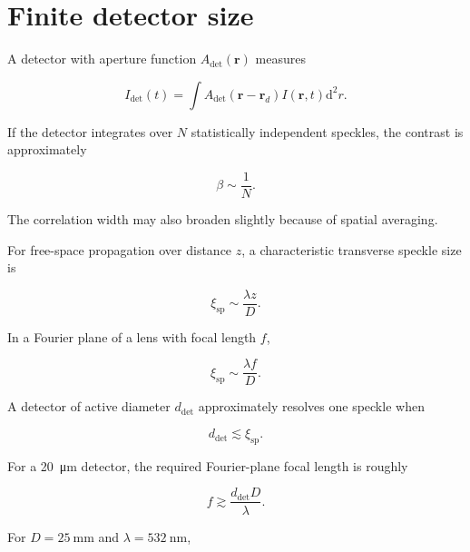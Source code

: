 \documentclass[11pt]{article}
\renewcommand{\dd}{\mathrm{d}}
\newcommand{\rvec}{\mathbf{r}}
\begin{document}
\section{Finite detector size}

A detector with aperture function $A_{\mathrm{det}}(\rvec)$ measures

\begin{equation}
    I_{\mathrm{det}}(t)
    =
    \int
    A_{\mathrm{det}}(\rvec-\rvec_d)
    I(\rvec,t)
    \dd^2r.
\end{equation}

If the detector integrates over $N$ statistically independent speckles, the
contrast is approximately

\begin{equation}
    \beta\sim\frac{1}{N}.
\end{equation}

The correlation width may also broaden slightly because of spatial averaging.

For free-space propagation over distance $z$, a characteristic transverse
speckle size is

\begin{equation}
    \xi_{\mathrm{sp}}
    \sim
    \frac{\lambda z}{D}.
\end{equation}

In a Fourier plane of a lens with focal length $f$,

\begin{equation}
    \xi_{\mathrm{sp}}
    \sim
    \frac{\lambda f}{D}.
\end{equation}

A detector of active diameter $d_{\mathrm{det}}$ approximately resolves one
speckle when

\begin{equation}
    d_{\mathrm{det}}
    \lesssim
    \xi_{\mathrm{sp}}.
\end{equation}

For a \SI{20}{\micro\meter} detector, the required Fourier-plane focal length
is roughly

\begin{equation}
    f
    \gtrsim
    \frac{
        d_{\mathrm{det}}D
    }{
        \lambda
    }.
\end{equation}

For $D=\SI{25}{\milli\meter}$ and
$\lambda=\SI{532}{\nano\meter}$,
\end{document}
